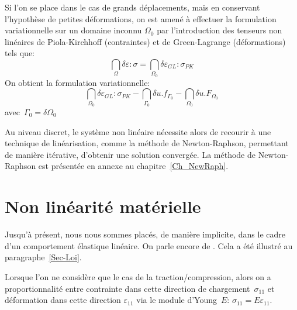 Si l'on se place dans le cas de grands déplacements, mais en conservant l'hypothèse de petites
déformations, on est amené à effectuer la formulation variationnelle sur un domaine inconnu
$\Omega_0$ par l'introduction des tenseurs non linéaires de Piola-Kirchhoff
(contraintes) et de Green-Lagrange
(déformations) tels que:
\begin{equation}
\dint_\Omega \delta\varepsilon:\sigma = \dint_{\Omega_0} \delta\varepsilon_{GL}:\sigma_{PK}
\end{equation}
On obtient la formulation variationnelle:
\begin{equation}
\dint_{\Omega_0}\delta\varepsilon_{GL}:\sigma_{PK} -\dint_{\Gamma_0} \delta u.f_{\Gamma_0}
-\dint_{\Omega_0} \delta u.F_{\Omega_0}
\end{equation}
avec~$\Gamma_0=\delta\Omega_0$

\medskip
Au niveau discret, le système non linéaire nécessite alors de recourir à une technique de linéarisation,
comme la méthode de Newton-Raphson, permettant de manière itérative, d'obtenir une solution convergée.
La méthode de
Newton-Raphson
est présentée en annexe au chapitre~\ref{Ch_NewRaph}.












\medskip
\section{Non linéarité matérielle}\label{Sec-NLMat}

Jusqu'à présent, nous nous sommes placés, de manière implicite, dans le cadre d'un comportement
élastique linéaire. On parle encore de .
Cela a été illustré au paragraphe~\ref{Sec-Loi}.

Lorsque l'on ne considère que le cas de la traction/compression, alors on a proportionnalité entre
contrainte dans cette direction de chargement~$\sigma_{11}$ et déformation dans cette direction
$\varepsilon_{11}$ via le module d'Young~$E$:
$\sigma_{11}=E\varepsilon_{11}$.

